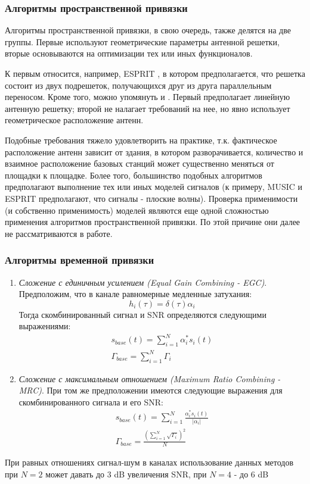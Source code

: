 \documentclass[a4paper,12pt,oneside]{scrartcl}
\begin{document}
\subsubsection{Алгоритмы пространственной привязки}
Алгоритмы пространственной привязки, в свою очередь, также делятся на две группы. Первые используют геометрические параметры антенной решетки, вторые основываются на оптимизации тех или иных функционалов.

К первым относится, например, ESPRIT \cite{A4}, в котором предполагается, что решетка состоит из двух подрешеток, получающихся друг из друга параллельным переносом. 
Кроме того, можно упомянуть \cite{A5} и \cite{A6}. 
Первый предполагает линейную антенную решетку; второй не налагает требований на нее, но явно использует геометрическое расположение антенн.

Подобные требования тяжело удовлетворить на практике, т.к. фактическое расположение антенн зависит от здания, в котором разворачивается, количество и взаимное расположение базовых станций может существенно меняться от площадки к площадке. 
Более того, большинство подобных алгоритмов предполагают выполнение тех или иных моделей сигналов (к примеру, MUSIC и ESPRIT предполагают, что сигналы - плоские волны). 
Проверка применимости (и собственно применимость) моделей являются еще одной сложностью применения алгоритмов пространственной привязки. 
По этой причине они далее не рассматриваются в работе. 
\subsubsection{Алгоритмы временной привязки}
\begin{enumerate}
\item \textit{Сложение с единичным усилением (Equal Gain Combining - EGC)}. Предположим, что в канале равномерные медленные затухания:
\begin{equation}
h_i(\tau) = \delta(\tau)\alpha_i
\label{eq:impulse}
\end{equation} 
Тогда скомбинированный сигнал и SNR определяются следующими выражениями:
\begin{gather}
s_{base}(t) = \sum\limits_{i=1}^N \alpha_i^*s_i(t) \\
\Gamma_{base} = \sum\limits_{i=1}^N \Gamma_i
\label{eq:egc}
\end{gather}
\item \textit{Сложение с максимальным отношением (Maximum Ratio Combining - MRC)}. При том же предположении имеются следующие выражения для скомбинированного сигнала и его SNR:
\begin{gather}
s_{base}(t) = \sum\limits_{i=1}^N \frac{\alpha_i^*s_i(t)}{|\alpha_i|} \\
\Gamma_{base} = \frac{\left(\sum\limits_{i=1}^N \sqrt{\Gamma_i}\right)^2}{N}
\label{eq:mrc}
\end{gather}
\end{enumerate}
При равных отношениях сигнал-шум в каналах использование данных методов при $N=2$ может давать до 3 dB увеличения SNR, при $N=4$ - до 6 dB
\end{document}

